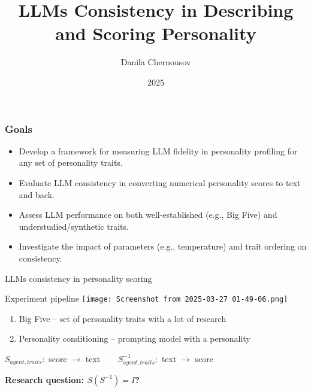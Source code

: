 \documentclass[12pt,pdf,hyperref={unicode}]{beamer}
\title{LLMs Consistency in Describing and Scoring Personality}
\author{Danila Chernousov}
\institute[]{MIPT}
\date{2025}
\begin{document}
\begin{frame}
\titlepage
\end{frame}
\setcounter{page}{2}%
\begin{frame}
\frametitle{Goals}
\begin{itemize}
    \item Develop a framework for measuring LLM fidelity in personality profiling for any set of personality traits.
    \item Evaluate LLM consistency in converting numerical personality scores to text and back.
    \item Assess LLM performance on both well-established (e.g., Big Five) and understudied/synthetic traits.
    \item Investigate the impact of parameters (e.g., temperature) and trait ordering on consistency.
\end{itemize}
\end{frame}



\begin{frame}{LLMs consistency in personality scoring}

Experiment pipeline
	\texttt{[image: Screenshot from 2025-03-27 01-49-06.png]}  

\begin{enumerate}[1.]
    \item Big Five -- set of personality traits with a lot of research
    \item Personality conditioning -- prompting model with a personality
\end{enumerate}

     $S_{agent, traits}:$ score $\rightarrow$ text $ \ \ \ \ \ \ \ \ $$S_{agent, traits}^{-1}:$ text $\rightarrow$ score
    
\begin{center}
\textbf{Research question: $S(S^{-1}) = I$?}
\end{center}

\end{frame}
\end{document}
